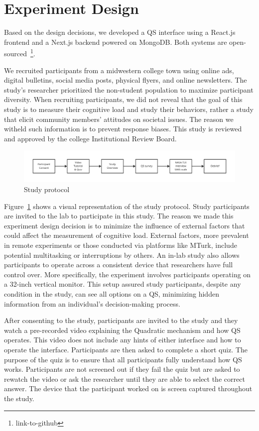 \section{Experiment Design}
\label{sec:experiment}
Based on the design decisions, we developed a QS interface using a React.js frontend and a Next.js backend powered on MongoDB. Both systems are open-sourced~\footnote{link-to-github}.

We recruited participants from a midwestern college town using online ads, digital bulletins, social media posts, physical flyers, and online newsletters. The study's researcher prioritized the non-student population to maximize participant diversity. When recruiting participants, we did not reveal that the goal of this study is to measure their cognitive load and study their behaviors, rather a study that elicit community members' attitudes on societal issues. The reason we witheld such information is to prevent response biases. This study is reviewed and approved by the college Institutional Review Board.

\begin{figure}[ht]
    \centering
    \includegraphics[width=1\textwidth]{content/image/study_flow.pdf}
    \caption{Study protocol}
    \label{fig:studyProtocol}
\end{figure}

Figure~\ref{fig:studyProtocol} shows a visual representation of the study protocol. Study participants are invited to the lab to participate in this study. The reason we made this experiment design decision is to minimize the influence of external factors that could affect the measurement of cognitive load. External factors, more prevalent in remote experiments or those conducted via platforms like MTurk, include potential multitasking or interruptions by others. An in-lab study also allows participants to operate across a consistent device that researchers have full control over. More specifically, the experiment involves participants operating on a 32-inch vertical monitor. This setup assured study participants, despite any condition in the study, can see all options on a QS, minimizing hidden information from an individual's decision-making process.

After consenting to the study, participants are invited to the study and they watch a pre-recorded video explaining the Quadratic mechanism and how QS operates. This video does not include any hints of either interface and how to operate the interface. Participants are then asked to complete a short quiz. The purpose of the quiz is to ensure that all participants fully understand how QS works. Participants are not screened out if they fail the quiz but are asked to rewatch the video or ask the researcher until they are able to select the correct answer. The device that the participant worked on is screen captured throughout the study.

